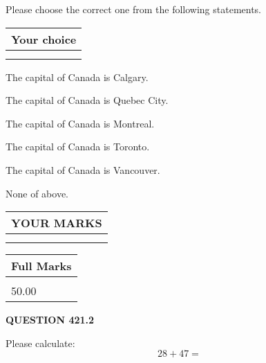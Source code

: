 \documentclass[12pt]{article}
\begin{document}
  
Please choose the correct one from the following statements.
  
  
\noindent\hspace{3.0in} \begin{tabular}{|l|}
\hline
Your choice \\
\hline
 \\ 
 \\ 
\hline
\end{tabular}
  
  
 
 
The capital of Canada is Calgary.
 
 
The capital of Canada is Quebec City.
 
 
The capital of Canada is Montreal.
 
 
The capital of Canada is Toronto.
 
 
The capital of Canada is Vancouver.
 
 
 None of above.
 
 
  
\vspace{0.2in}
  
\noindent\begin{tabular}{|l|}
\hline
 YOUR MARKS  \\
\hline
 \\ 
 \\ 
\hline
\end{tabular}
\hspace{0.05in} \begin{tabular}{|l|}
\hline
 Full Marks  \\
\hline
 \\ 
50.00 \\
\hline
\end{tabular}
{\textbf{\Large{QUESTION
421.2 
}}}
  
  
 
Please calculate:
\begin{equation}
28 +  %
47 = \nonumber
\end{equation}
 

 

 
   
   
 \vspace{0.2in}
 
   
   
   
   
\end{document}
